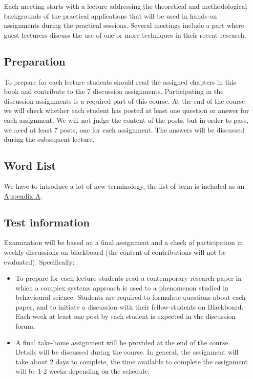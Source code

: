 \documentclass[12pt,]{book}
\providecommand{\tightlist}{%
  \setlength{\itemsep}{0pt}\setlength{\parskip}{0pt}}
\begin{document}
Each meeting starts with a lecture addressing the theoretical and methodological backgrounds of the practical applications that will be used in hands-on assignments during the practical sessions. Several meetings include a part where guest lecturers discuss the use of one or more techniques in their recent research.

\hypertarget{preparation}{%
\subsection*{Preparation}\label{preparation}}

To prepare for each lecture students should read the assigned chapters in this book and contribute to the 7 discussion assignments. Participating in the discussion assignments is a required part of this course. At the end of the course we will check whether each student has posted at least one question or answer for each assignment. We will not judge the content of the posts, but in order to pass, we need at least 7 posts, one for each assignment. The answers will be discussed during the subsequent lecture.

\hypertarget{word-list}{%
\subsection*{Word List}\label{word-list}}

We have to introduce a lot of new terminology, the list of term is included as an \protect\hyperlink{Adap1}{Appendix A}.

\hypertarget{test-information}{%
\subsection*{Test information}\label{test-information}}

Examination will be based on a final assignment and a check of participation in weekly discussions on blackboard (the content of contributions will not be evaluated).
Specifically:

\begin{itemize}
\tightlist
\item
  To prepare for each lecture students read a contemporary research paper in which a complex systems approach is used to a phenomenon studied in behavioural science. Students are required to formulate questions about each paper, and to initiate a discussion with their fellow-students on Blackboard. Each week at least one post by each student is expected in the discussion forum.
\item
  A final take-home assignment will be provided at the end of the course. Details will be discussed during the course. In general, the assignment will take about 2 days to complete, the time available to complete the assignment will be 1-2 weeks depending on the schedule.
\end{itemize}
\end{document}
